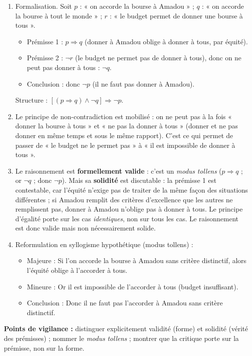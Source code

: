 \documentclass[11pt]{article}
\newcommand{\cle}[1]{{\popxbold\color{popdark}#1}}
\begin{document}
\begin{corrige}
\begin{enumerate}
    \item Formalisation. Soit $p$ : « on accorde la bourse à Amadou » ; $q$ : « on accorde la bourse à tout le monde » ; $r$ : « le budget permet de donner une bourse à tous ».
    \begin{itemize}
        \item Prémisse 1 : $p \Rightarrow q$ (donner à Amadou oblige à donner à tous, par équité).
        \item Prémisse 2 : $\neg r$ (le budget ne permet pas de donner à tous), donc on ne peut pas donner à tous : $\neg q$.
        \item Conclusion : donc $\neg p$ (il ne faut pas donner à Amadou).
    \end{itemize}
    Structure : $[(p \Rightarrow q) \land \neg q] \Rightarrow \neg p$.
    \item Le \cle{principe de non-contradiction} est mobilisé : on ne peut pas à la fois « donner la bourse à tous » et « ne pas la donner à tous » (donner et ne pas donner en même temps et sous le même rapport). C'est ce qui permet de passer de « le budget ne le permet pas » à « il est impossible de donner à tous ».
    \item Le raisonnement est \textbf{formellement valide} : c'est un \emph{modus tollens} ($p \Rightarrow q$ ; or $\neg q$ ; donc $\neg p$). Mais sa \textbf{solidité} est discutable : la prémisse 1 est contestable, car l'équité n'exige pas de traiter de la même façon des situations différentes ; si Amadou remplit des critères d'excellence que les autres ne remplissent pas, donner à Amadou n'oblige pas à donner à tous. Le principe d'égalité porte sur les cas \emph{identiques}, non sur tous les cas. Le raisonnement est donc valide mais non nécessairement solide.
    \item Reformulation en syllogisme hypothétique (modus tollens) :
    \begin{itemize}
        \item Majeure : Si l'on accorde la bourse à Amadou sans critère distinctif, alors l'équité oblige à l'accorder à tous.
        \item Mineure : Or il est impossible de l'accorder à tous (budget insuffisant).
        \item Conclusion : Donc il ne faut pas l'accorder à Amadou sans critère distinctif.
    \end{itemize}
\end{enumerate}
\textbf{Points de vigilance :} distinguer explicitement validité (forme) et solidité (vérité des prémisses) ; nommer le \emph{modus tollens} ; montrer que la critique porte sur la prémisse, non sur la forme.
\end{corrige}
\end{document}
